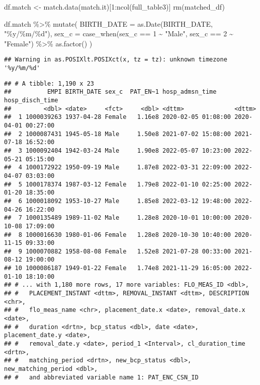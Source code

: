 \documentclass[
]{article}
\newenvironment{Shaded}{\begin{snugshade}}{\end{snugshade}}
\newcommand{\AttributeTok}[1]{\textcolor[rgb]{0.77,0.63,0.00}{#1}}
\newcommand{\DecValTok}[1]{\textcolor[rgb]{0.00,0.00,0.81}{#1}}
\newcommand{\FunctionTok}[1]{\textcolor[rgb]{0.00,0.00,0.00}{#1}}
\newcommand{\NormalTok}[1]{#1}
\newcommand{\OtherTok}[1]{\textcolor[rgb]{0.56,0.35,0.01}{#1}}
\newcommand{\SpecialCharTok}[1]{\textcolor[rgb]{0.00,0.00,0.00}{#1}}
\newcommand{\StringTok}[1]{\textcolor[rgb]{0.31,0.60,0.02}{#1}}
\begin{document}
\begin{Shaded}
\begin{Highlighting}[]
\NormalTok{df.match }\OtherTok{\textless{}{-}} \FunctionTok{match.data}\NormalTok{(match.it)[}\DecValTok{1}\SpecialCharTok{:}\FunctionTok{ncol}\NormalTok{(full\_table3)]}
\FunctionTok{rm}\NormalTok{(matched\_df)}

\NormalTok{df.match }\SpecialCharTok{\%\textgreater{}\%} 
  \FunctionTok{mutate}\NormalTok{(}
    \AttributeTok{BIRTH\_DATE =} \FunctionTok{as.Date}\NormalTok{(BIRTH\_DATE, }\StringTok{"\%y/\%m/\%d"}\NormalTok{),}
    \AttributeTok{sex\_c =} \FunctionTok{case\_when}\NormalTok{(sex\_c }\SpecialCharTok{==} \DecValTok{1} \SpecialCharTok{\textasciitilde{}} \StringTok{"Male"}\NormalTok{,}
\NormalTok{              sex\_c }\SpecialCharTok{==} \DecValTok{2} \SpecialCharTok{\textasciitilde{}} \StringTok{"Female"}\NormalTok{) }\SpecialCharTok{\%\textgreater{}\%} 
      \FunctionTok{as.factor}\NormalTok{()}
\NormalTok{  ) }
\end{Highlighting}
\end{Shaded}

\begin{verbatim}
## Warning in as.POSIXlt.POSIXct(x, tz = tz): unknown timezone '%y/%m/%d'
\end{verbatim}

\begin{verbatim}
## # A tibble: 1,190 x 23
##          EMPI BIRTH_DATE sex_c  PAT_EN~1 hosp_admsn_time     hosp_disch_time    
##         <dbl> <date>     <fct>     <dbl> <dttm>              <dttm>             
##  1 1000039263 1937-04-28 Female   1.16e8 2020-02-05 01:08:00 2020-04-01 00:27:00
##  2 1000087431 1945-05-18 Male     1.50e8 2021-07-02 15:08:00 2021-07-18 16:52:00
##  3 1000092404 1942-03-24 Male     1.90e8 2022-05-07 10:23:00 2022-05-21 05:15:00
##  4 1000172922 1950-09-19 Male     1.87e8 2022-03-31 22:09:00 2022-04-07 03:03:00
##  5 1000178374 1987-03-12 Female   1.79e8 2022-01-10 02:25:00 2022-01-20 18:35:00
##  6 1000018092 1953-10-27 Male     1.85e8 2022-03-12 19:48:00 2022-04-26 16:22:00
##  7 1000135489 1989-11-02 Male     1.28e8 2020-10-01 10:00:00 2020-10-08 17:09:00
##  8 1000016630 1980-01-06 Female   1.28e8 2020-10-30 10:40:00 2020-11-15 09:33:00
##  9 1000070882 1958-08-08 Female   1.52e8 2021-07-28 00:33:00 2021-08-12 19:00:00
## 10 1000086187 1949-01-22 Female   1.74e8 2021-11-29 16:05:00 2022-01-10 18:10:00
## # ... with 1,180 more rows, 17 more variables: FLO_MEAS_ID <dbl>,
## #   PLACEMENT_INSTANT <dttm>, REMOVAL_INSTANT <dttm>, DESCRIPTION <chr>,
## #   flo_meas_name <chr>, placement_date.x <date>, removal_date.x <date>,
## #   duration <drtn>, bcp_status <dbl>, date <date>, placement_date.y <date>,
## #   removal_date.y <date>, period_1 <Interval>, cl_duration_time <drtn>,
## #   matching_period <drtn>, new_bcp_status <dbl>, new_matching_period <dbl>,
## #   and abbreviated variable name 1: PAT_ENC_CSN_ID
\end{verbatim}
\end{document}
